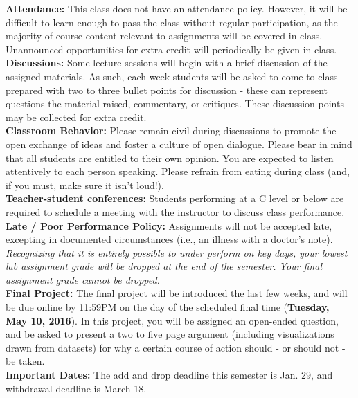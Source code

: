 \documentclass[11pt]{article}
\begin{document}
\textbf {\large Attendance:} This class does not have an attendance policy.  However, it will be difficult to learn enough to pass the class without regular participation, as the majority of course content relevant to assignments will be covered in class.  Unannounced opportunities for extra credit will periodically be given in-class.\\

\textbf {\large Discussions:} Some lecture sessions will begin with a brief discussion of the assigned materials.  As such, each week students will be asked to come to class prepared with two to three bullet points for discussion - these can represent questions the material raised, commentary, or critiques.  These discussion points may be collected for extra credit.\\

\textbf {\large Classroom Behavior:} Please remain civil during discussions to promote the open exchange of ideas and foster a culture of open dialogue.  Please bear in mind that all students are entitled to their own opinion.  You are expected to listen attentively to each person speaking.  Please refrain from eating during class (and, if you must, make sure it isn't loud!).\\

\textbf {\large Teacher-student conferences:} Students performing at a C level or below are required to schedule a meeting with the instructor to discuss class performance.\\

\textbf {\large Late / Poor Performance Policy:} Assignments will not be accepted late, excepting in documented circumstances (i.e., an illness with a doctor's note).  \textit{Recognizing that it is entirely possible to under perform on key days, your lowest lab assignment grade will be dropped at the end of the semester. Your final assignment grade cannot be dropped.}\\

\textbf {\large Final Project:} The final project will be introduced the last few weeks, and will be due online by 11:59PM on the day of the scheduled final time (\textbf{Tuesday, May 10, 2016}). In this project, you will be assigned an open-ended question, and be asked to present a two to five page argument (including visualizations drawn from datasets) for why a certain course of action should - or should not - be taken. \\

\textbf {\large Important Dates:} The add and drop deadline this semester is Jan. 29, and withdrawal deadline is March 18. \\
\end{document}
